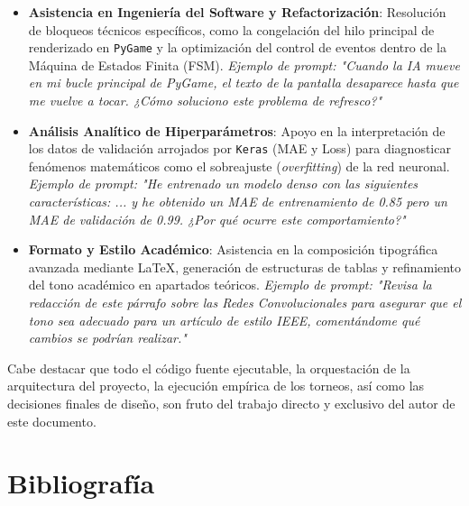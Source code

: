 \documentclass[conference]{IEEEtran}
\begin{document}
\begin{itemize}
    \item \textbf{Asistencia en Ingeniería del Software y Refactorización}: Resolución de bloqueos técnicos específicos, como la congelación del 
    hilo principal de renderizado en \texttt{PyGame} y la optimización del control de eventos dentro de la Máquina de Estados Finita (FSM). 
    \textit{Ejemplo de prompt: "Cuando la IA mueve en mi bucle principal de PyGame, el texto de la pantalla desaparece hasta que me vuelve a tocar. ¿Cómo soluciono este problema de refresco?"}\\
    
    \item \textbf{Análisis Analítico de Hiperparámetros}: Apoyo en la interpretación de los datos de validación arrojados por \texttt{Keras} (MAE y Loss) para 
    diagnosticar fenómenos matemáticos como el sobreajuste (\textit{overfitting}) de la red neuronal. 
    \textit{Ejemplo de prompt: "He entrenado un modelo denso con las siguientes características: ... y he obtenido un MAE de entrenamiento de 0.85 pero un MAE de validación de 0.99. ¿Por qué ocurre este comportamiento?"}\\
    
    \item \textbf{Formato y Estilo Académico}: Asistencia en la composición tipográfica avanzada mediante \LaTeX, generación de estructuras de tablas y refinamiento del 
    tono académico en apartados teóricos. 
    \textit{Ejemplo de prompt: "Revisa la redacción de este párrafo sobre las Redes Convolucionales para asegurar que el tono sea adecuado para un artículo de estilo IEEE, comentándome qué cambios se podrían realizar."}
\end{itemize}

Cabe destacar que todo el código fuente ejecutable, la orquestación de la arquitectura del proyecto, la ejecución empírica de 
los torneos, así como las decisiones finales de diseño, son fruto del trabajo directo y exclusivo del autor de este documento.

\section{Bibliografía}
\end{document}
